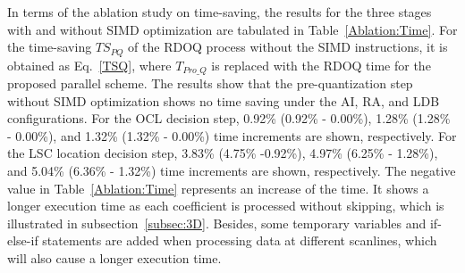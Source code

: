 \documentclass[lettersize,journal]{IEEEtran}
\begin{document}

In terms of the ablation study on time-saving, the results for the three stages with and without SIMD optimization are tabulated in Table~\ref{Ablation:Time}. For the time-saving $TS_{PQ}$ of the RDOQ process without the SIMD instructions, it is obtained as Eq.~\eqref{TSQ}, where $T_{Pro\_Q}^{}$ is replaced with the RDOQ time for the proposed parallel scheme. The results show that the pre-quantization step without SIMD optimization shows no time saving under the AI, RA, and LDB configurations. For the OCL decision step, 0.92\% (0.92\% - 0.00\%), 1.28\% (1.28\% - 0.00\%), and 1.32\% (1.32\% - 0.00\%) time increments are shown, respectively. For the LSC location decision step, 3.83\% (4.75\% -0.92\%), 4.97\% (6.25\% - 1.28\%), and 5.04\% (6.36\% - 1.32\%) time increments are shown, respectively. The negative value in Table~\ref{Ablation:Time} represents an increase of the time. It shows a longer execution time as each coefficient is processed without skipping, which is illustrated in subsection~\ref{subsec:3D}. Besides, some temporary variables and if-else-if statements are added when processing data at different scanlines, which will also cause a longer execution time. 
\end{document}
